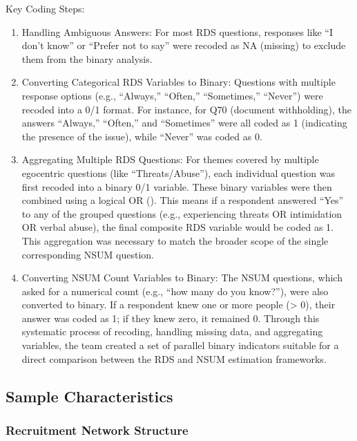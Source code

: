 \documentclass[
  12pt,
  letterpaper,
  DIV=11,
  numbers=noendperiod]{scrartcl}
\providecommand{\tightlist}{%
  \setlength{\itemsep}{0pt}\setlength{\parskip}{0pt}}
\theoremstyle{plain}
\theoremstyle{definition}
\begin{document}
Key Coding Steps:

\begin{enumerate}
\def\labelenumi{\arabic{enumi}.}
\tightlist
\item
  Handling Ambiguous Answers: For most RDS questions, responses like ``I
  don't know'' or ``Prefer not to say'' were recoded as NA (missing) to
  exclude them from the binary analysis.
\item
  Converting Categorical RDS Variables to Binary: Questions with
  multiple response options (e.g., ``Always,'' ``Often,'' ``Sometimes,''
  ``Never'') were recoded into a 0/1 format. For instance, for Q70
  (document withholding), the answers ``Always,'' ``Often,'' and
  ``Sometimes'' were all coded as 1 (indicating the presence of the
  issue), while ``Never'' was coded as 0.
\item
  Aggregating Multiple RDS Questions: For themes covered by multiple
  egocentric questions (like ``Threats/Abuse''), each individual
  question was first recoded into a binary 0/1 variable. These binary
  variables were then combined using a logical OR (\textbar). This means
  if a respondent answered ``Yes'' to any of the grouped questions
  (e.g., experiencing threats OR intimidation OR verbal abuse), the
  final composite RDS variable would be coded as 1. This aggregation was
  necessary to match the broader scope of the single corresponding NSUM
  question.
\item
  Converting NSUM Count Variables to Binary: The NSUM questions, which
  asked for a numerical count (e.g., ``how many do you know?''), were
  also converted to binary. If a respondent knew one or more people
  (\textgreater{} 0), their answer was coded as 1; if they knew zero, it
  remained 0. Through this systematic process of recoding, handling
  missing data, and aggregating variables, the team created a set of
  parallel binary indicators suitable for a direct comparison between
  the RDS and NSUM estimation frameworks.
\end{enumerate}

\subsection{Sample Characteristics}\label{sample-characteristics}

\subsubsection{Recruitment Network
Structure}\label{recruitment-network-structure}
\end{document}
